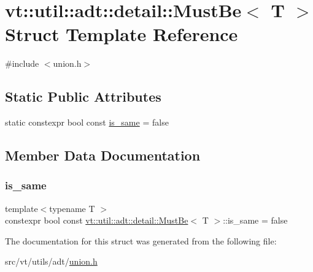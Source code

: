 \hypertarget{structvt_1_1util_1_1adt_1_1detail_1_1_must_be_3_01_t_01_4}{}\section{vt\+:\+:util\+:\+:adt\+:\+:detail\+:\+:Must\+Be$<$ T $>$ Struct Template Reference}
\label{structvt_1_1util_1_1adt_1_1detail_1_1_must_be_3_01_t_01_4}


{\ttfamily \#include $<$union.\+h$>$}

\subsection*{Static Public Attributes}
\begin{DoxyCompactItemize}
\item 
static constexpr bool const \hyperlink{structvt_1_1util_1_1adt_1_1detail_1_1_must_be_3_01_t_01_4_a8708bc6f123e9851bc944a785e01e54f}{is\+\_\+same} = false
\end{DoxyCompactItemize}


\subsection{Member Data Documentation}
\mbox{\label{structvt_1_1util_1_1adt_1_1detail_1_1_must_be_3_01_t_01_4_a8708bc6f123e9851bc944a785e01e54f}} 
\subsubsection{\texorpdfstring{is\+\_\+same}{is\_same}}
{\footnotesize\ttfamily template$<$typename T $>$ \\
constexpr bool const \hyperlink{structvt_1_1util_1_1adt_1_1detail_1_1_must_be}{vt\+::util\+::adt\+::detail\+::\+Must\+Be}$<$ T $>$\+::is\+\_\+same = false\hspace{0.3cm}{\ttfamily [static]}}



The documentation for this struct was generated from the following file\+:\begin{DoxyCompactItemize}
\item 
src/vt/utils/adt/\hyperlink{union_8h}{union.\+h}\end{DoxyCompactItemize}
